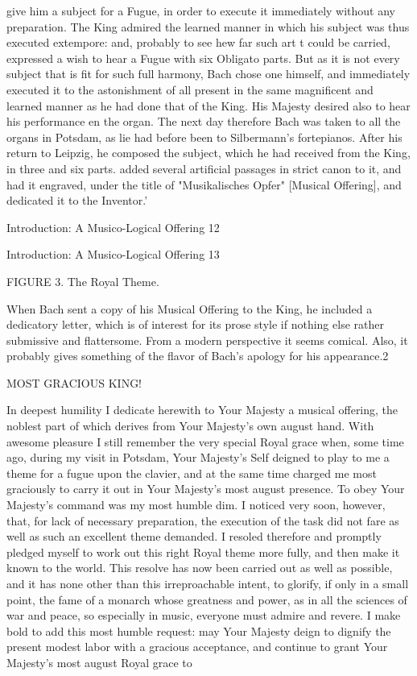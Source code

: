  give him a subject for a Fugue, in order to execute it immediately without any
 preparation. The King admired the learned manner in which his subject was thus
 executed extempore: and, probably to see hew far such art t could be carried, expressed
 a wish to hear a Fugue with six Obligato parts. But as it is not every subject that is fit
 for such full harmony, Bach chose one himself, and immediately executed it to the
 astonishment of all present in the same magnificent and learned manner as he had done
 that of the King. His Majesty desired also to hear his performance en the organ. The
 next day therefore Bach was taken to all the organs in Potsdam, as lie had before been
 to Silbermann's fortepianos. After his return to Leipzig, he composed the subject, which
 he had received from the King, in three and six parts. added several artificial passages
 in strict canon to it, and had it engraved, under the title of "Musikalisches Opfer"
 [Musical Offering], and dedicated it to the Inventor.'




Introduction: A Musico-Logical Offering                                                  12

Introduction: A Musico-Logical Offering   13

FIGURE 3. The Royal Theme.

   When Bach sent a copy of his Musical Offering to the King, he included a dedicatory
letter, which is of interest for its prose style if nothing else rather submissive and
flattersome. From a modern perspective it seems comical. Also, it probably gives
something of the flavor of Bach's apology for his appearance.2

  MOST GRACIOUS KING!

  In deepest humility I dedicate herewith to Your Majesty a musical offering, the
  noblest part of which derives from Your Majesty's own august hand. With awesome
  pleasure I still remember the very special Royal grace when, some time ago, during
  my visit in Potsdam, Your Majesty's Self deigned to play to me a theme for a fugue
  upon the clavier, and at the same time charged me most graciously to carry it out in
  Your Majesty's most august presence. To obey Your Majesty's command was my most
  humble dim. I noticed very soon, however, that, for lack of necessary preparation, the
  execution of the task did not fare as well as such an excellent theme demanded. I
  resoled therefore and promptly pledged myself to work out this right Royal theme
  more fully, and then make it known to the world. This resolve has now been carried
  out as well as possible, and it has none other than this irreproachable intent, to glorify,
  if only in a small point, the fame of a monarch whose greatness and power, as in all
  the sciences of war and peace, so especially in music, everyone must admire and
  revere. I make bold to add this most humble request: may Your Majesty deign to
  dignify the present modest labor with a gracious acceptance, and continue to grant
  Your Majesty's most august Royal grace to

